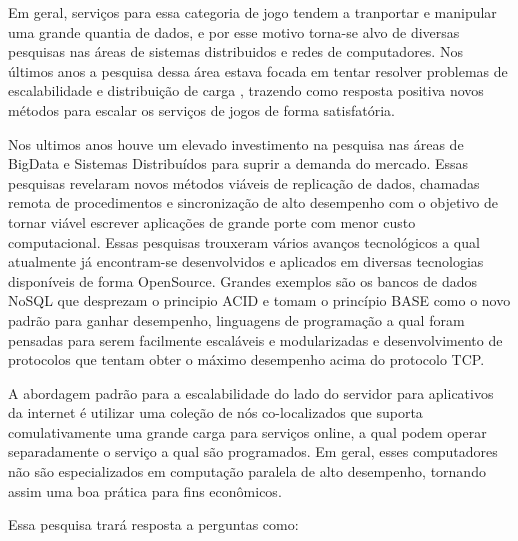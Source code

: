 Em geral, serviços para essa categoria de jogo tendem a tranportar e manipular uma grande quantia de dados, e por esse motivo torna-se alvo de diversas pesquisas nas áreas de sistemas distribuidos e redes de computadores. Nos últimos anos a pesquisa dessa área estava focada em tentar resolver problemas de escalabilidade e distribuição de carga \cite{load_balance} \cite{kd_tree}, trazendo como resposta positiva novos métodos para escalar os serviços de jogos de forma satisfatória.

Nos ultimos anos houve um elevado investimento na pesquisa nas áreas de BigData e Sistemas Distribuídos para suprir a demanda do mercado. Essas pesquisas revelaram novos métodos viáveis de replicação de dados, chamadas remota de procedimentos e sincronização de alto desempenho com o objetivo de tornar viável escrever aplicações de grande porte com menor custo computacional. Essas pesquisas trouxeram vários avanços tecnológicos a qual atualmente já encontram-se desenvolvidos e aplicados em diversas tecnologias disponíveis de forma OpenSource. Grandes exemplos são os bancos de dados NoSQL que desprezam o principio ACID e tomam o princípio BASE como o novo padrão para ganhar desempenho, linguagens de programação a qual foram pensadas para serem facilmente escaláveis e modularizadas e desenvolvimento de protocolos que tentam obter o máximo desempenho acima do protocolo TCP.

A abordagem padrão para a escalabilidade do lado do servidor para aplicativos da internet é utilizar uma coleção de nós co-localizados que suporta comulativamente uma grande carga para serviços online, a qual podem operar separadamente o serviço a qual são programados. Em geral, esses computadores não são especializados em computação paralela de alto desempenho, tornando assim uma boa prática para fins econômicos\cite{4553340}.

Essa pesquisa trará resposta a perguntas como:

